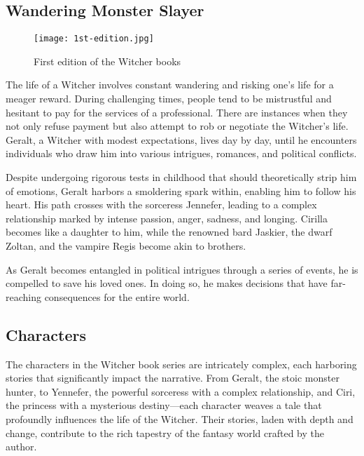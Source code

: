 \documentclass{article}
\begin{document}
\subsection{Wandering Monster Slayer}

\begin{figure}
\centering
\texttt{[image: 1st-edition.jpg]}
\caption{\label{fig:geralt}First edition of the Witcher books}
\end{figure}

The life of a Witcher involves constant wandering and risking one's life for a meager reward. During challenging times, people tend to be mistrustful and hesitant to pay for the services of a professional. There are instances when they not only refuse payment but also attempt to rob or negotiate the Witcher's life. Geralt, a Witcher with modest expectations, lives day by day, until he encounters individuals who draw him into various intrigues, romances, and political conflicts.

Despite undergoing rigorous tests in childhood that should theoretically strip him of emotions, Geralt harbors a smoldering spark within, enabling him to follow his heart. His path crosses with the sorceress Jennefer, leading to a complex relationship marked by intense passion, anger, sadness, and longing. Cirilla becomes like a daughter to him, while the renowned bard Jaskier, the dwarf Zoltan, and the vampire Regis become akin to brothers.

As Geralt becomes entangled in political intrigues through a series of events, he is compelled to save his loved ones. In doing so, he makes decisions that have far-reaching consequences for the entire world.


\subsection{Characters}

The characters in the Witcher book series are intricately complex, each harboring stories that significantly impact the narrative. From Geralt, the stoic monster hunter, to Yennefer, the powerful sorceress with a complex relationship, and Ciri, the princess with a mysterious destiny—each character weaves a tale that profoundly influences the life of the Witcher. Their stories, laden with depth and change, contribute to the rich tapestry of the fantasy world crafted by the author.
\end{document}
